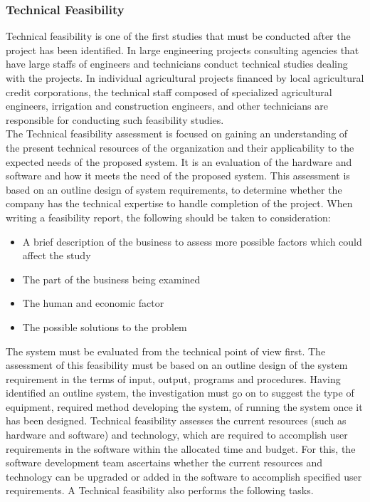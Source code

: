 \subsubsection{Technical Feasibility}
Technical feasibility is one of the first studies that must be conducted after the project has been identified. In large engineering projects consulting agencies that have large staffs of engineers and technicians conduct technical studies dealing with the projects. In individual agricultural projects financed by local agricultural credit corporations, the technical staff composed of specialized agricultural engineers, irrigation and construction engineers, and other technicians are responsible for conducting such feasibility studies.\\ The Technical feasibility assessment is focused on gaining an understanding of the present technical resources of the organization and their applicability to the expected needs of the proposed system. It is an evaluation of the hardware and software and how it meets the need of the proposed system. This assessment is based on an outline design of system requirements, to determine whether the company has the technical expertise to handle completion of the project. When writing a feasibility report, the following should be taken to consideration:
\begin{itemize}
	\item A brief description of the business to assess more possible factors which could affect the study
	\item The part of the business being examined
	\item The human and economic factor
	\item The possible solutions to the problem
\end{itemize}

The system must be evaluated from the technical point of view first. The assessment of this feasibility must be based on an outline design of the system requirement in the terms of input, output, programs and procedures. Having identified an outline system, the investigation must go on to suggest the type of equipment, required method developing the system, of running the system once it has been designed. Technical feasibility assesses the current resources (such as hardware and software) and technology, which are required to accomplish user requirements in the software within the allocated time and budget. For this, the software development team ascertains whether the current resources and technology can be upgraded or added in the software to accomplish specified user requirements. A Technical feasibility also performs the following tasks.

